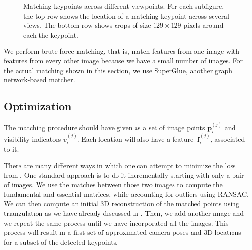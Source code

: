 \begin{figure}
    \caption{Matching keypoints across different viewpoints. For each subfigure, the top row shows the location of a matching keypoint across several views. The bottom row shows crops of size $129 \times 129$ pixels around each the keypoint.}
    \label{fig:sfm:palma_keypoint_matching_figure}
\end{figure}








We perform brute-force matching, that is, match features from one image with features from every other image because we have a small number of images.
For the actual matching shown in this section, we use SuperGlue, another graph network-based matcher.

\subsection{Optimization}

The matching procedure should have given as a set of image points $\mathbf{p}^{(j)}_i$ and visibility indicators $v_i^{(j)}$. Each location will also have a feature, $\mathbf{f}^{(j)}_i$, associated to it.

There are many different ways in which one can attempt to minimize the loss from \eqn{\ref{eq:final_reprojection_error}}. One standard approach is to do it incrementally starting with only a pair of images. We use the matches between those two images to compute the fundamental and essential matrices, while accounting for outliers using RANSAC. We can then compute an initial 3D reconstruction of the matched points using triangulation as we have already discussed in \chap{\ref{chap:stereo_vision}}. Then, we add another image and we repeat the same process until we have incorporated all the images.  This process will result in a first set of approximated camera poses and 3D locations for a subset of the detected keypoints.


